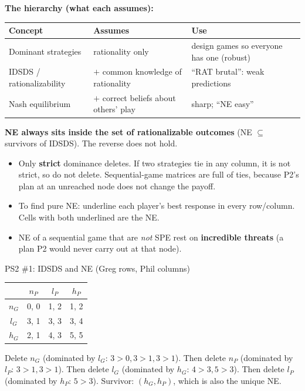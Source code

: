 \documentclass[11pt]{article}
\begin{document}
\textbf{The hierarchy (what each assumes):}
\begin{center}
\begin{tabular}{@{}p{3.6cm}p{5.4cm}p{5.6cm}@{}}
\toprule
Concept & Assumes & Use\\\midrule
Dominant strategies & rationality only & design games so everyone has one (robust)\\
IDSDS / rationalizability & $+$ common knowledge of rationality & ``RAT brutal'': weak predictions\\
Nash equilibrium & $+$ correct beliefs about others' play & sharp; ``NE easy''\\
\bottomrule
\end{tabular}
\end{center}
\textbf{NE always sits inside the set of rationalizable outcomes} (NE $\subseteq$ survivors of IDSDS). The reverse does not hold.

\begin{tipbox}
\begin{itemize}[nosep]
\item Only \textbf{strict} dominance deletes. If two strategies tie in any column, it is not strict, so do not delete. Sequential-game matrices are full of ties, because P2's plan at an unreached node does not change the payoff.
\item To find pure NE: underline each player's best response in every row/column. Cells with both underlined are the NE.
\item NE of a sequential game that are \emph{not} SPE rest on \textbf{incredible threats} (a plan P2 would never carry out at that node).
\end{itemize}
\end{tipbox}

\begin{workbox}{PS2 \#1: IDSDS and NE (Greg rows, Phil columns)}
\begin{center}
\begin{tabular}{c|ccc}
 & $n_P$ & $l_P$ & $h_P$\\\hline
$n_G$ & 0, 0 & 1, 2 & 1, 2\\
$l_G$ & 3, 1 & 3, 3 & 3, 4\\
$h_G$ & 2, 1 & 4, 3 & 5, 5
\end{tabular}
\end{center}
Delete $n_G$ (dominated by $l_G$: $3>0,3>1,3>1$). Then delete $n_P$ (dominated by $l_P$: $3>1,3>1$). Then delete $l_G$ (dominated by $h_G$: $4>3,5>3$). Then delete $l_P$ (dominated by $h_P$: $5>3$). Survivor: $(h_G,h_P)$, which is also the unique NE.
\end{workbox}
\end{document}
